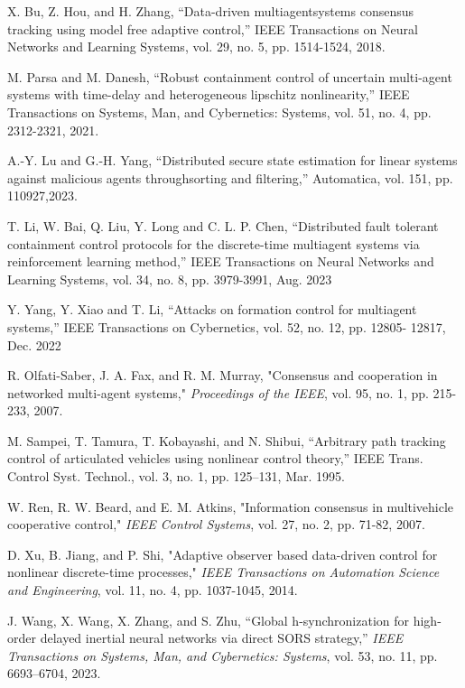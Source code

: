 \documentclass[journal,onecolumn]{IEEEtran}
\begin{document}
\begin{thebibliography}{99}


    X. Bu, Z. Hou, and H. Zhang, “Data-driven multiagentsystems consensus tracking using model free adaptive control,” IEEE Transactions on Neural Networks and Learning
    Systems, vol. 29, no. 5, pp. 1514-1524, 2018.
    
    M. Parsa and M. Danesh, “Robust containment control of uncertain multi-agent systems with time-delay and heterogeneous lipschitz nonlinearity,” IEEE Transactions on Systems, Man, and Cybernetics: Systems, vol. 51, no. 4, pp.
    2312-2321, 2021.

    A.-Y. Lu and G.-H. Yang, “Distributed secure state estimation for linear systems against malicious agents throughsorting and filtering,” Automatica, vol. 151, pp. 110927,2023.

    T. Li, W. Bai, Q. Liu, Y. Long and C. L. P. Chen, “Distributed fault tolerant containment control protocols for the discrete-time multiagent systems via reinforcement learning method,” IEEE Transactions on Neural Networks and Learning Systems, vol. 34, no. 8, pp. 3979-3991, Aug. 2023
    
    Y. Yang, Y. Xiao and T. Li, “Attacks on formation control for multiagent
    systems,” IEEE Transactions on Cybernetics, vol. 52, no. 12, pp. 12805-
    12817, Dec. 2022
    
    R. Olfati-Saber, J. A. Fax, and R. M. Murray, "Consensus and cooperation in networked multi-agent systems," \textit{Proceedings of the IEEE}, vol. 95, no. 1, pp. 215-233, 2007.
    
    M. Sampei, T. Tamura, T. Kobayashi, and N. Shibui, “Arbitrary path
    tracking control of articulated vehicles using nonlinear control theory,”
    IEEE Trans. Control Syst. Technol., vol. 3, no. 1, pp. 125–131, Mar. 1995.
    
    W. Ren, R. W. Beard, and E. M. Atkins, "Information consensus in multivehicle cooperative control," \textit{IEEE Control Systems}, vol. 27, no. 2, pp. 71-82, 2007.
    
    D. Xu, B. Jiang, and P. Shi, "Adaptive observer based data-driven control for nonlinear discrete-time processes," \textit{IEEE Transactions on Automation Science and Engineering}, vol. 11, no. 4, pp. 1037-1045, 2014.
    
    J. Wang, X. Wang, X. Zhang, and S. Zhu, “Global h-synchronization for high-order delayed inertial neural networks via direct SORS strategy,” \textit{IEEE Transactions on Systems, Man, and Cybernetics: Systems}, vol. 53, no. 11, pp. 6693–6704, 2023.
    

\end{thebibliography}
\end{document}
